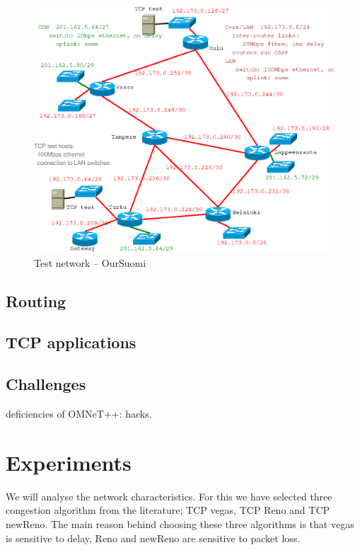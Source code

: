 \documentclass[conference,a4paper]{IEEEtran}
\begin{document}
\begin{figure}[h]
\begin{center}
\includegraphics[scale=0.5]{plan.eps}
\caption{Test network -- OurSuomi}
\label{fig1}
\end{center}
\end{figure}

\subsection{Routing}

\subsection{TCP applications}

\subsection{Challenges}
deficiencies of OMNeT++: hacks.


\section{Experiments}

We will analyse the network characteristics. For this we have selected three congestion algorithm from the literature; TCP vegas, TCP Reno and TCP newReno. The main reason behind choosing these three algorithms is that vegas is sensitive to delay, Reno and newReno are sensitive to packet loss.
\end{document}

